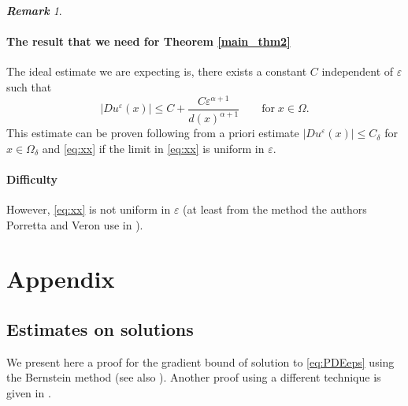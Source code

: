 \documentclass[12pt,reqno]{amsart}
\numberwithin{figure}{section}
\theoremstyle{plain}
\theoremstyle{remark}
\newtheorem{rem}{\bf{Remark}}
\numberwithin{equation}{section}
\begin{document}
\begin{rem}
\paragraph{\textbf{The result that we need for Theorem \ref{main_thm2}}} The ideal estimate we are expecting is, there exists a constant $C$ independent of $\varepsilon$ such that
\begin{equation*}
|Du^\varepsilon(x)| \leq C + \frac{C\varepsilon^{\alpha+1}}{d(x)^{\alpha+1}} \qquad\text{for}\;x\in \Omega.
\end{equation*}
This estimate can be proven following from a priori estimate $|Du^\varepsilon(x)|\leq C_\delta$ for $x\in \Omega_\delta$ and \eqref{eq:xx} if the limit in \eqref{eq:xx} is uniform in $\varepsilon$.

\paragraph{\textbf{Difficulty}} However, \eqref{eq:xx} is not uniform in $\varepsilon$ (at least from the method the authors Porretta and Veron use in \cite{alessio_asymptotic_2006}).
\end{rem}












\section*{Appendix}
\subsection*{Estimates on solutions}
We present here a proof for the gradient bound of solution to \eqref{eq:PDEeps} using the Bernstein method (see also \cite{Lasry1989,lions_quelques_1985}). Another proof using a different technique is given in \cite{Armstrong2015a}.
\end{document}

